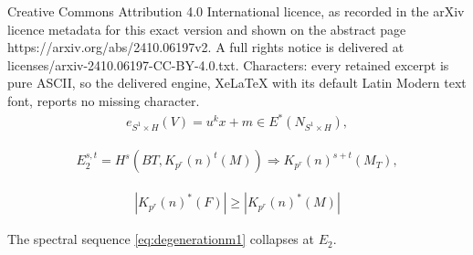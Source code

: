 \documentclass[10pt,a4paper]{amsart}
\begin{document}
Creative Commons Attribution 4.0 International licence, as recorded in the arXiv licence metadata for this exact version and shown on the abstract page https://arxiv.org/abs/2410.06197v2. A full rights notice is delivered at licenses/arxiv-2410.06197-CC-BY-4.0.txt. Characters: every retained excerpt is pure ASCII, so the delivered engine, XeLaTeX with its default Latin Modern text font, reports no missing character.
\begin{align} \label{eq:restrictioneuler} 
e_{S^1\times H}(V)= u^kx + m \in E^*(N_{S^1 \times H}),  
\end{align}  

\begin{align} 
\label{eq:degenerationm1} E_2^{s,t}= H^s(BT, K_{p^r}(n)^t(M)) \Rightarrow K_{p^r}(n)^{s+t}(M_T), 
\end{align}

\begin{align} \label{eq:Morseinequalities} 
|K_{p^r}(n)^*(F)| \geq  |K_{p^r}(n)^*(M)| 
\end{align} 

\begin{prop} \label{prop:prMoravacircle} 
The  spectral sequence \eqref{eq:degenerationm1} collapses at $E_2$.    
\end{prop}
\end{document}
